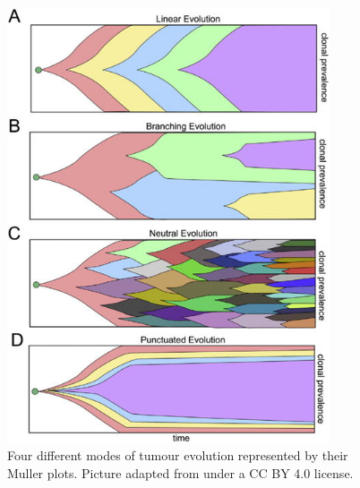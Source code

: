 \begin{figure}[ht!]
    \centering
    \includegraphics[width=0.85\textwidth]{Chapter_3/figures/modes.jpeg}
    \caption{Four different modes of tumour evolution represented by their
    Muller plots. Picture adapted from \cite{davis_tumor_2017} under a CC BY
    4.0 license.}
    \label{fig:modes}
\end{figure}

